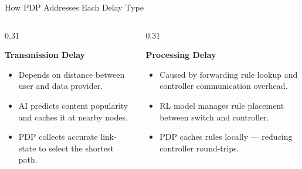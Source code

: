 {
\begin{frame}{How PDP Addresses Each Delay Type}


  \begin{columns}[T, totalwidth=\textwidth]

    \begin{column}{0.31\textwidth}
      \begin{tcolorbox}[problemcard=HUAblue]
        {\color{HUAblue}\bfseries\small
          Transmission Delay}
        \vspace{4pt}
        \begin{itemize}
          \setlength\itemsep{3pt}
          \fontsize{7}{8}\selectfont\color{HUAdark}
          \item Depends on distance between
                user and data provider.
          \item AI predicts content popularity
                and caches it at nearby nodes.
          \item PDP collects accurate link-state
                to select the shortest path.
        \end{itemize}
      \end{tcolorbox}
    \end{column}

    \begin{column}{0.31\textwidth}
      \begin{tcolorbox}[problemcard=problemorange]
        {\color{problemorange}\bfseries\small
          Processing Delay}
        \vspace{4pt}
        \begin{itemize}
          \setlength\itemsep{3pt}
          \fontsize{7}{8}\selectfont\color{HUAdark}
          \item Caused by forwarding rule
                lookup and controller
                communication overhead.
          \item RL model manages rule
                placement between switch
                and controller.
          \item PDP caches rules locally ---
                reducing controller round-trips.
        \end{itemize}
      \end{tcolorbox}
    \end{column}


\end{columns}
\end{frame}}
